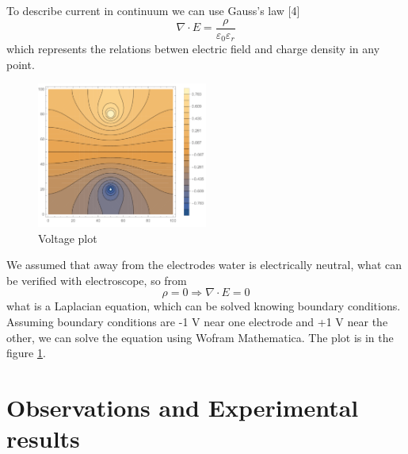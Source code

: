 \documentclass{article}
\begin{document}
To describe current in continuum we can use Gauss's law [4] $$\nabla\cdot E = \frac{\rho}{\varepsilon_0 \varepsilon_r}$$ which represents the relations betwen electric field and charge density in any point.\par

\begin{figure}[h]
    \centering
    \includegraphics[width=0.5\textwidth]{theory plot.pdf}
    \caption{Voltage plot}
    \label{fig:mesh3}
\end{figure}

We assumed that away from the electrodes water is electrically neutral, what can be verified with electroscope, so from $$\rho = 0 \Rightarrow \nabla \cdot E = 0$$ what is a Laplacian equation, which can be solved knowing boundary conditions. Assuming boundary conditions are -1 V near one electrode and +1 V near the other, we can solve the equation using Wofram Mathematica. The plot is in the figure \ref{fig:mesh3}. \par



\section{Observations and Experimental results}
\end{document}
